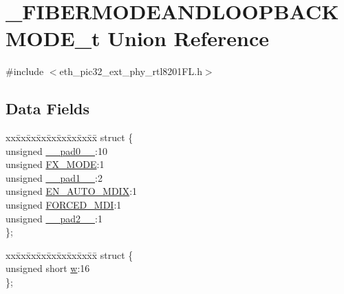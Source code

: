 \hypertarget{union___f_i_b_e_r_m_o_d_e_a_n_d_l_o_o_p_b_a_c_k_m_o_d_e__t}{}\section{\+\_\+\+F\+I\+B\+E\+R\+M\+O\+D\+E\+A\+N\+D\+L\+O\+O\+P\+B\+A\+C\+K\+M\+O\+D\+E\+\_\+t Union Reference}
\label{union___f_i_b_e_r_m_o_d_e_a_n_d_l_o_o_p_b_a_c_k_m_o_d_e__t}


{\ttfamily \#include $<$eth\+\_\+pic32\+\_\+ext\+\_\+phy\+\_\+rtl8201\+F\+L.\+h$>$}

\subsection*{Data Fields}
\begin{DoxyCompactItemize}
\item 
\begin{tabbing}
xx\=xx\=xx\=xx\=xx\=xx\=xx\=xx\=xx\=\kill
struct \{\\
\>unsigned \hyperlink{union___f_i_b_e_r_m_o_d_e_a_n_d_l_o_o_p_b_a_c_k_m_o_d_e__t_adf71f3d8410c1f1dbbc96680a92c49af}{\_\_pad0\_\_}:10\\
\>unsigned \hyperlink{union___f_i_b_e_r_m_o_d_e_a_n_d_l_o_o_p_b_a_c_k_m_o_d_e__t_ab50d14d58caa17f1b7681744217a1f2d}{FX\_MODE}:1\\
\>unsigned \hyperlink{union___f_i_b_e_r_m_o_d_e_a_n_d_l_o_o_p_b_a_c_k_m_o_d_e__t_acaf2d0924a107ec6e8d2e31febaf66f9}{\_\_pad1\_\_}:2\\
\>unsigned \hyperlink{union___f_i_b_e_r_m_o_d_e_a_n_d_l_o_o_p_b_a_c_k_m_o_d_e__t_a30c0ed28d9c749faa6155e4373b1f39a}{EN\_AUTO\_MDIX}:1\\
\>unsigned \hyperlink{union___f_i_b_e_r_m_o_d_e_a_n_d_l_o_o_p_b_a_c_k_m_o_d_e__t_a15fd0a0422e0bcab1c7f9a676c1b87c2}{FORCED\_MDI}:1\\
\>unsigned \hyperlink{union___f_i_b_e_r_m_o_d_e_a_n_d_l_o_o_p_b_a_c_k_m_o_d_e__t_a4d97cc5f7d51d22fc2bf3eab35c9cb7f}{\_\_pad2\_\_}:1\\
\}; \\

\end{tabbing}\item 
\begin{tabbing}
xx\=xx\=xx\=xx\=xx\=xx\=xx\=xx\=xx\=\kill
struct \{\\
\>unsigned short \hyperlink{union___f_i_b_e_r_m_o_d_e_a_n_d_l_o_o_p_b_a_c_k_m_o_d_e__t_a160850a4684a3e82c2323033964f2e98}{w}:16\\
\}; \\

\end{tabbing}\end{DoxyCompactItemize}


